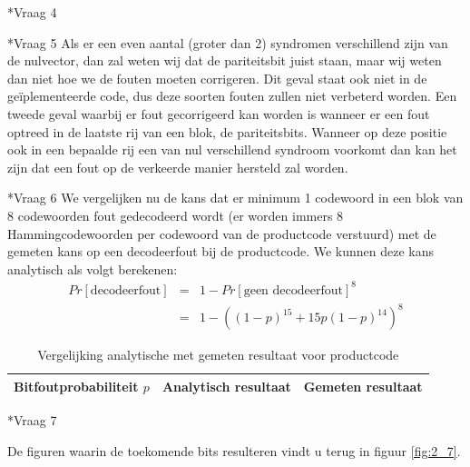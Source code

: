 \documentclass[]{article}
\begin{document}
\begin{section}
\begin{subsection}
    \end{subsection}

    \begin{subsection}*{Vraag 4} %
    \end{subsection}

    \begin{subsection}*{Vraag 5} %
    	Als er een even aantal (groter dan 2) syndromen verschillend zijn van de nulvector,
    	dan zal weten wij dat de pariteitsbit juist staan, maar wij weten dan niet hoe we
    	de fouten moeten corrigeren. Dit geval staat ook niet in de ge\"iplementeerde code,
    	dus deze soorten fouten zullen niet verbeterd worden.
    	Een tweede geval waarbij er fout gecorrigeerd kan worden is wanneer er een fout
    	optreed in de laatste rij van een blok, de pariteitsbits. Wanneer op deze positie
    	ook in een bepaalde rij een van nul verschillend syndroom voorkomt dan kan het zijn
    	dat een fout op de verkeerde manier hersteld zal worden.
    \end{subsection}

    \begin{subsection}*{Vraag 6} %
   	We vergelijken nu de kans dat er minimum 1 codewoord in een blok van 8 codewoorden fout gedecodeerd wordt (er worden immers 8 Hammingcodewoorden per codewoord van de productcode verstuurd) met de gemeten kans op een decodeerfout bij de productcode.
	We kunnen deze kans analytisch als volgt berekenen:
    	\begin{eqnarray*}
		Pr[\text{decodeerfout}]&=& 1 - Pr[\text{geen decodeerfout}]^8 \\ 
						&=& 1 - ((1-p)^{15} + 15p(1-p)^{14})^8
	\end{eqnarray*}

	    	\begin{table}[htpb]
    		\centering	
    		\begin{tabular}{r|r|r}
    		Bitfoutprobabiliteit $p$ & Analytisch resultaat & Gemeten resultaat \\
    		\hline
    		\end{tabular}
    		\caption{Vergelijking analytische met gemeten resultaat voor productcode}
    	\end{table}
    \end{subsection}

    \begin{subsection}*{Vraag 7} %

        De figuren waarin de toekomende bits resulteren vindt u terug in figuur
        \ref{fig:2_7}.
        

\end{subsection}
\end{section}
\end{document}

